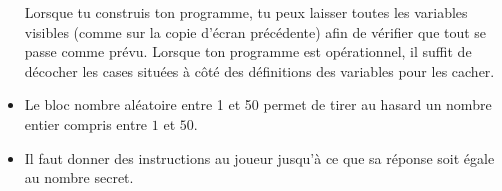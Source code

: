 \documentclass[class=report,crop=false, 12pt]{standalone}
\begin{document}
\begin{activite}
\begin{itemize}
\smallskip

Lorsque tu construis ton programme, tu peux laisser toutes les variables visibles (comme sur la copie d'écran précédente) afin de vérifier que tout se passe comme prévu. Lorsque ton programme est opérationnel, il suffit de décocher les cases situées à côté des définitions des variables pour les cacher.
    
\smallskip

  \item Le bloc \og nombre aléatoire entre 1 et 50\fg{} permet de tirer au hasard un nombre entier compris entre $1$ et $50$.
  

\begin{center}
\end{center}
  
\smallskip

  \item Il faut donner des instructions au joueur jusqu'à ce que sa réponse soit égale au nombre secret.
\begin{center}
\begin{scratch}
  {\blockspace}
\end{scratch}
\end{center}
\end{itemize}

\end{activite}
\end{document}
